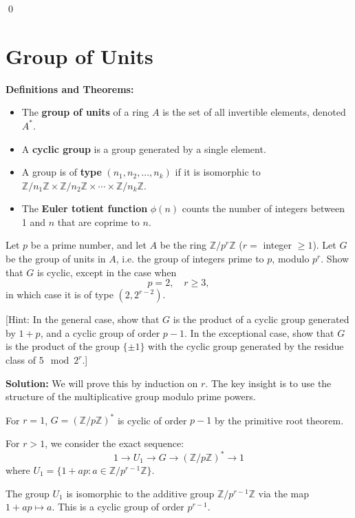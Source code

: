\qed
\section{Group of Units}

\noindent\textbf{Definitions and Theorems:}
\begin{itemize}
\item The \textbf{group of units} of a ring $A$ is the set of all invertible elements, denoted $A^*$.
\item A \textbf{cyclic group} is a group generated by a single element.
\item A group is of \textbf{type} $(n_1, n_2, \ldots, n_k)$ if it is isomorphic to $\mathbb{Z}/n_1\mathbb{Z} \times \mathbb{Z}/n_2\mathbb{Z} \times \cdots \times \mathbb{Z}/n_k\mathbb{Z}$.
\item The \textbf{Euler totient function} $\phi(n)$ counts the number of integers between 1 and $n$ that are coprime to $n$.
\end{itemize}

\begin{problembox}
Let $p$ be a prime number, and let $A$ be the ring $\mathbb{Z}/p^r\mathbb{Z}$ ($r =$ integer $\geq 1$). Let $G$ be the group of units in $A$, i.e. the group of integers prime to $p$, modulo $p^r$. Show that $G$ is cyclic, except in the case when
\[ p = 2, \quad r \geq 3, \]
in which case it is of type $(2, 2^{r-2})$. 

[Hint: In the general case, show that $G$ is the product of a cyclic group generated by $1 + p$, and a cyclic group of order $p - 1$. In the exceptional case, show that $G$ is the product of the group $\{\pm 1\}$ with the cyclic group generated by the residue class of $5 \mod 2^r$.]
\end{problembox}

\noindent\textbf{Solution:}
We will prove this by induction on $r$. The key insight is to use the structure of the multiplicative group modulo prime powers.

For $r = 1$, $G = (\mathbb{Z}/p\mathbb{Z})^*$ is cyclic of order $p-1$ by the primitive root theorem.

For $r > 1$, we consider the exact sequence:
\[ 1 \rightarrow U_1 \rightarrow G \rightarrow (\mathbb{Z}/p\mathbb{Z})^* \rightarrow 1 \]
where $U_1 = \{1 + ap : a \in \mathbb{Z}/p^{r-1}\mathbb{Z}\}$.

The group $U_1$ is isomorphic to the additive group $\mathbb{Z}/p^{r-1}\mathbb{Z}$ via the map $1 + ap \mapsto a$. This is a cyclic group of order $p^{r-1}$.

